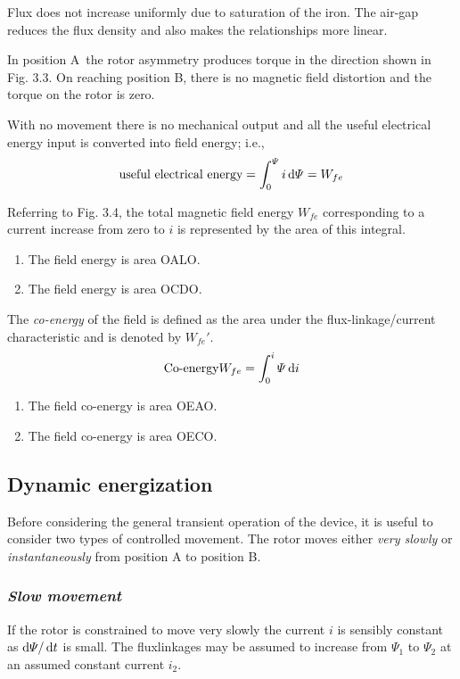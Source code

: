 \documentclass[a4paper,numbers=noenddot,12pt]{scrbook}
\begin{document}
Flux does not increase uniformly due to saturation of the iron. The air-gap reduces the flux density and also makes the relationships more linear.

In position A\ the rotor asymmetry produces torque in the direction shown in Fig. 3.3. On reaching position B, there is no magnetic field distortion and the torque on the rotor is zero.

With no movement there is no mechanical output and all the useful electrical energy input is converted into field energy; i.e.,
\begin{equation}
    \text{useful electrical energy} = \int_0^{\varPsi} i \dif \varPsi = W_{fe}
    \label{eq:Eq3.13}
\end{equation}

Referring to Fig. 3.4, the total magnetic field energy $W_{fe}$ corresponding to a current increase from zero to $i$ is represented by the area of this integral.
\begin{enumerate}[label={Position \Alph*:},leftmargin=3cm]
    \item The field energy is area OALO.\@
    \item The field energy is area OCDO.\@
\end{enumerate}

The \textit{co-energy} of the field is defined as the area under the flux-linkage/current characteristic and is denoted by $W_{fe}'$.
\begin{equation}
    \text{Co-energy} W_{fe} = \int_0^i \varPsi \dif i
    \label{eq:Eq3.14}
\end{equation}

\begin{enumerate}[label={Position \Alph*:},leftmargin=3cm]
    \item The field co-energy is area OEAO.\@
    \item The field co-energy is area OECO.\@
\end{enumerate}

\subsection{Dynamic energization} Before considering the general transient operation of the device, it is useful to consider two types of controlled movement. The rotor moves either \textit{very slowly} or \textit{instantaneously} from position A to position B. 
\subsubsection{\textit{Slow movement}} If the rotor is constrained to move very slowly the current $i$ is sensibly constant as $\dif \varPsi / \dif t$ is small. The flux­linkages may be assumed to increase from $\varPsi_1$ to $\varPsi_2$ at an assumed constant current $i_2$.
\end{document}
